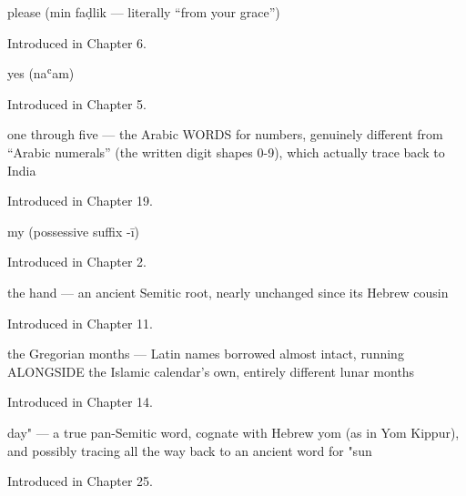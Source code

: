 \noindent\begin{minipage}[t]{\linewidth}
\raggedright
\textbf{ }\par
\small please (min faḍlik — literally \textquotedblleft{}from your grace\textquotedblright{})\par
\footnotesize Introduced in Chapter 6.
\end{minipage}\par\medskip

\noindent\begin{minipage}[t]{\linewidth}
\raggedright
\textbf{}\par
\small yes (naʿam)\par
\footnotesize Introduced in Chapter 5.
\end{minipage}\par\medskip

\noindent\begin{minipage}[t]{\linewidth}
\raggedright
\textbf{    }\par
\small one through five — the Arabic WORDS for numbers, genuinely different from \textquotedblleft{}Arabic numerals\textquotedblright{} (the written digit shapes 0-9), which actually trace back to India\par
\footnotesize Introduced in Chapter 19.
\end{minipage}\par\medskip

\noindent\begin{minipage}[t]{\linewidth}
\raggedright
\textbf{}\par
\small my (possessive suffix -ī)\par
\footnotesize Introduced in Chapter 2.
\end{minipage}\par\medskip

\noindent\begin{minipage}[t]{\linewidth}
\raggedright
\textbf{}\par
\small the hand — an ancient Semitic root, nearly unchanged since its Hebrew cousin\par
\footnotesize Introduced in Chapter 11.
\end{minipage}\par\medskip

\noindent\begin{minipage}[t]{\linewidth}
\raggedright
\textbf{           }\par
\small the Gregorian months — Latin names borrowed almost intact, running ALONGSIDE the Islamic calendar's own, entirely different lunar months\par
\footnotesize Introduced in Chapter 14.
\end{minipage}\par\medskip

\noindent\begin{minipage}[t]{\linewidth}
\raggedright
\textbf{}\par
\small day" — a true pan-Semitic word, cognate with Hebrew yom (as in Yom Kippur), and possibly tracing all the way back to an ancient word for "sun\par
\footnotesize Introduced in Chapter 25.
\end{minipage}\par\medskip
